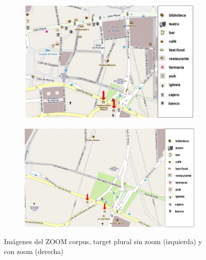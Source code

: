 \begin{figure}[!ht]
\begin{subfigure}{.47\textwidth}
\centering
\includegraphics[width=\textwidth]{images/corpus/mapa10.png}\\[0pt]
\caption{}
\label{pluralx}
\end{subfigure}
\begin{subfigure}{.53\textwidth}
\centering
\includegraphics[width=\textwidth]{images/corpus/mapa20.png}\\[0pt]
\caption{}
\label{plural2x}
\end{subfigure}
\caption{Im\'agenes del ZOOM corpus, target plural sin zoom (izquierda) y con zoom (derecha)}\label{imagenes-zoom-corpus}
\end{figure}

